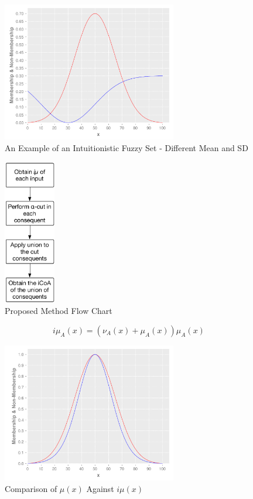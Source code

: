 \documentclass[conference]{IEEEtran}
\begin{document}
\begin{figure}[!t]
  \centering
  \includegraphics[width=3.0in]{ifs-diff-mu-sd}
  \caption{An Example of an Intuitionistic Fuzzy Set - Different Mean
    and SD}
  \label{ifs-diff-mu-sd}
\end{figure}

\begin{figure}[!t]
  \centering
  \includegraphics[height=2.5in]{proposed-method-flow-chart}
  \caption{Proposed Method Flow Chart}
  \label{flow-chart}
\end{figure}

\begin{equation}
  \label{imembership}
  i\mu_{A}(x) = (\nu_{A}(x) + \mu_{A}(x))\mu_{A}(x)
\end{equation}

\begin{figure}[!t]
  \centering
  \includegraphics[width=3.0in]{if-membership}
  \caption{Comparison of $\mu(x)$ Against $i\mu(x)$}
  \label{if-membership}
\end{figure}
\end{document}
